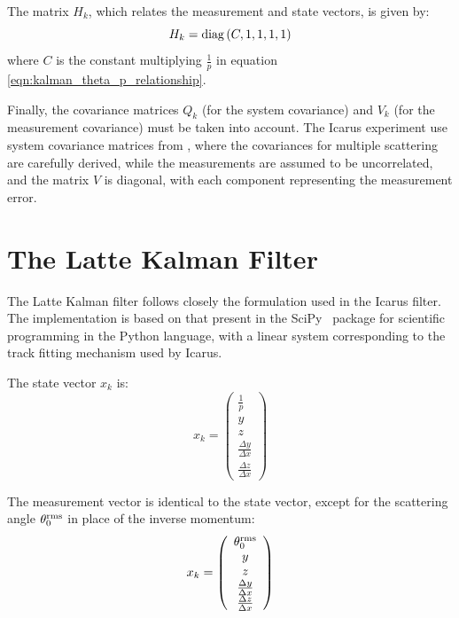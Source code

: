 The matrix $H_k$, which relates the measurement and state vectors, is given by:
\begin{equation}\label{eqn:kalman_measurement_matrix}
    H_k = \mathrm{diag} \left( C, 1, 1, 1, 1 \right)
\end{equation}
where $C$ is the constant multiplying $\displaystyle \frac{1}{p}$ in equation \eqref{eqn:kalman_theta_p_relationship}.

Finally, the covariance matrices $Q_k$ (for the system covariance) and $V_k$ (for the measurement covariance) must be taken into account. The Icarus experiment use system covariance matrices from \citep{Wolin1993}, where the covariances for multiple scattering are carefully derived, while the measurements are assumed to be uncorrelated, and the matrix $V$ is diagonal, with each component representing the measurement error.

\section{The Latte Kalman Filter}
The Latte Kalman filter follows closely the formulation used in the Icarus filter. The implementation is based on that present in the SciPy~\citep{SciPy} package for scientific programming in the Python language, with a linear system corresponding to the track fitting mechanism used by Icarus.

The state vector $x_k$ is:
\begin{equation}\label{eqn:kalman_latte_state_vector}
    x_k = \left(\begin{array}{c}
        \frac{1}{p} \\ y \\ z \\ \frac{\Delta y}{\Delta x} \\ \frac{\Delta z}{\Delta x}
    \end{array}\right)
\end{equation}

The measurement vector is identical to the state vector, except for the scattering angle $\theta_0^{\mathrm{rms}}$ in place of the inverse momentum:
\begin{equation}\label{eqn:kalman_latte_measurement_vector}
    x_k = \left(\begin{array}{c}
        \theta_0^{\mathrm{rms}} \\ y \\ z \\ \frac{\Delta y}{\Delta x} \\ \frac{\Delta z}{\Delta x}
    \end{array}\right)
\end{equation}


